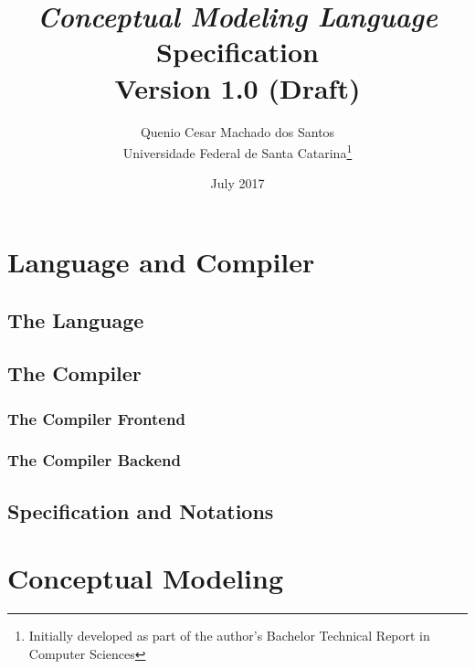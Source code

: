 \documentclass[a4paper,oneside,12pt, extrafontsizes]{memoir}
\title{\emph{Conceptual Modeling Language}\\Specification\\ \small{Version 1.0 (Draft)}}
\author{Quenio Cesar Machado dos Santos\\
\small{Universidade Federal de Santa Catarina}\thanks{
Initially developed as part of the author's Bachelor Technical Report in Computer Sciences}}
\date{July 2017}
\theoremstyle{definition}
\theoremstyle{definition}
\theoremstyle{definition}
\theoremstyle{definition}
\begin{document}
\begin{titlingpage}
\maketitle
\end{titlingpage}

\frontmatter

\begin{KeepFromToc}

\clearpage
\tableofcontents

\clearpage
\listoffigures

\clearpage
\listoftables

\end{KeepFromToc}

\mainmatter

\part{Language and Compiler}

\chapter{The Language}


\chapter{The Compiler}
\label{ch:compiler}


\section[The Frontend]{The Compiler Frontend}
\label{sec:frontend}


\section[The Backend]{The Compiler Backend}
\label{sec:backend}


\chapter{Specification and Notations}
\label{ch:notations}


\part{Conceptual Modeling}
\end{document}
